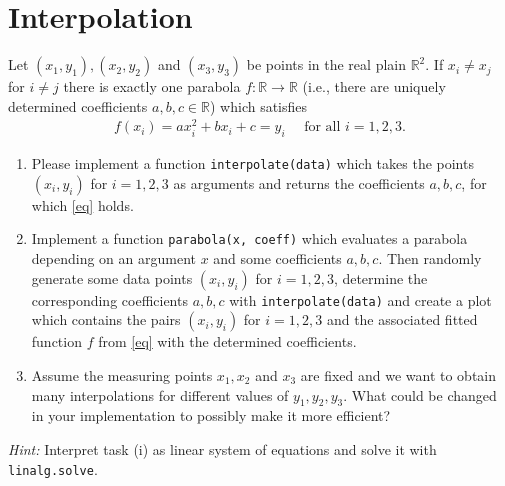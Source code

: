 \section{Interpolation}
Let $(x_1,y_1), (x_2,y_2)$ and $(x_3,y_3)$ be points in the real plain $\mathbb{R}^2$. If $x_i \neq x_j$ for $i \neq j$ there is exactly one 
parabola $f\colon \mathbb{R} \to \mathbb{R}$ (i.e., there are uniquely determined coefficients $a,b,c \in \mathbb{R}$) which satisfies
\begin{align}
f(x_i) = ax_i^2 + b x_i + c = y_i \label{eq} ~~~~~~\text{for all $i=1,2,3$.}
\end{align}

\begin{enumerate}
	\item Please implement a function \verb|interpolate(data)| which takes the points $(x_i, y_i)$ for $i=1,2,3$ as arguments and returns
	the coefficients $a,b,c$, for which \eqref{eq} holds.
	\item Implement a function \verb|parabola(x, coeff)| which evaluates a parabola depending on an argument $x$ and some coefficients $a,b,c$. Then randomly generate some data points $(x_i, y_i)$ for $i=1,2,3$, determine the corresponding coefficients $a,b,c$ with \verb|interpolate(data)| and create a plot which contains the pairs $(x_i, y_i)$ for $i=1,2,3$ and the associated fitted function $f$ from \eqref{eq} with the determined coefficients.
	\item Assume the measuring points $x_1, x_2$ and $x_3$ are fixed and we want to obtain many interpolations for different values of $y_1, y_2, y_3$. What could be changed in your implementation to possibly make it more efficient?
\end{enumerate}
\textit{Hint: } Interpret task (i) as linear system of equations and solve it with \verb|linalg.solve|. 
